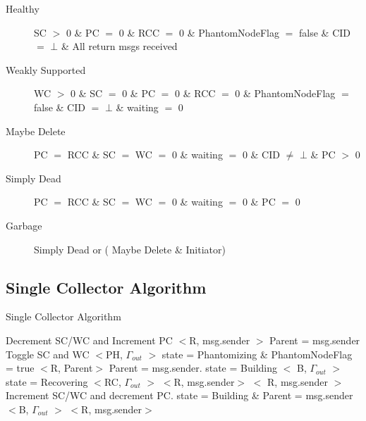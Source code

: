 \begin{description}
\item[Healthy] SC $>$ 0 \& PC $=$ 0 \& RCC $=$ 0 \& PhantomNodeFlag $=$ false 
\& CID $=$ $\bot$ \& All return msgs received
\item[Weakly Supported] WC $>$ 0 \& SC $=$ 0 \& PC $=$ 0 \& RCC
$=$ 0 \& PhantomNodeFlag $=$ false \& CID $=$ $\bot$ \& waiting $=$ 0 
\item[Maybe Delete] PC $=$ RCC \& SC $=$ WC $=$ 0 \& waiting $=$ 0 \& CID $\neq$ $\bot$ \& PC $>$ 0
\item [Simply Dead] PC $=$ RCC \& SC $=$ WC $=$ 0 \& waiting $=$ 0 \& PC $=$ 0
  	\item [Garbage] Simply Dead or  ( Maybe Delete \& Initiator)
\end{description}

\subsection{Single Collector Algorithm}
\label{singlealgo}
\begin{algorithm}[H]
\scriptsize
\caption{Single Collector Algorithm}
\label{Node Automaton}
\begin{algorithmic}[1]
	\State Decrement SC/WC and Increment PC
		\State $<$R, msg.sender $>$
	\Else
		\State Parent = msg.sender
			\State Toggle SC and WC
			\State $<$PH, $\Gamma_{out}$ $>$ 
			\State state = Phantomizing \& PhantomNodeFlag = true
		\EndIf
				\State $<$R, Parent$>$
		\EndIf
	\EndIf
{}
		\State Parent = msg.sender.
			\State state = Building
			\State $<$ B,  $\Gamma_{out}$ $>$ 
		\Else
			\State state = Recovering
			\State $<$RC, $\Gamma_{out}$ $>$ 
		\EndIf
			\State $<$R,  msg.sender$>$
		\EndIf
	\Else
		\State $<$ R, msg.sender $>$
	\EndIf
{}
	\State Increment SC/WC and decrement PC.
		\State state = Building \& Parent = msg.sender
		\State  $<$B,  $\Gamma_{out}$ $>$ 
	\Else
		\State  $<$R,  msg.sender$>$
	\EndIf
{}
\end{algorithmic}
\end{algorithm}

